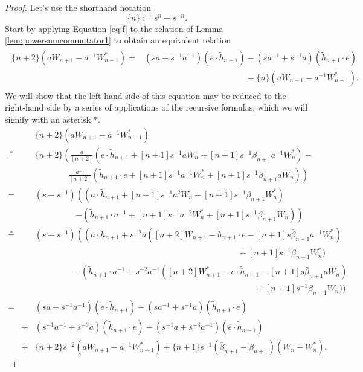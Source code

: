 \begin{proof}
Let's use the shorthand notation 
\[
\{n\} := s^n - s^{-n}.
\]
Start by applying Equation \eqref{eq:f} to the relation of Lemma \ref{lem:powersumcommutator1} to obtain an equivalent relation
\begin{align}\label{eq_perprel4}
\begin{split}
\{n+2\} \left( aW_{n+1} - a^{-1}W^*_{n+1} \right) =& \left( sa+s^{-1}a^{-1} \right) \left( e \cdot \tilde{h}_{n+1} \right) - \left( sa^{-1}+s^{-1}a \right) \left( \tilde{h}_{n+1} \cdot e \right) \\
 & \qquad\qquad\qquad\qquad\qquad\qquad - \{n\}\left( aW_{n-1}-a^{-1}W^*_{n-1} \right).
\end{split}
\end{align}
We will show that the left-hand side of this equation may be reduced to the right-hand side by a series of applications of the recursive formulas, which we will signify with an asterisk $\ast$. 
\begin{eqnarray*}
&& \{n+2\} \left( aW_{n+1} - a^{-1}W^*_{n+1} \right) \\
\overset{\ast}{=}&& \{n+2\} \left( \frac{a}{[n+2]} \left( e \cdot \tilde{h}_{n+1} + [n+1]s^{-1}aW_n + [n+1]s^{-1}\beta_{n+1}a^{-1}W^*_n \right) \right.- \\
&&\left.\qquad\qquad\frac{a^{-1}}{[n+2]} \left( \tilde{h}_{n+1} \cdot e + [n+1]s^{-1}a^{-1}W^*_n + [n+1]s^{-1}\beta_{n+1}aW_n \right) \right)  \\
=&& \left( s - s^{-1} \right) \left( \left( a \cdot \tilde{h}_{n+1} + [n+1]s^{-1}a^2W_n + [n+1]s^{-1}\beta_{n+1}W^*_n \right) \right. \\
&&\qquad\qquad\,\,\,\,\,\left.-\left( \tilde{h}_{n+1} \cdot a^{-1} + [n+1]s^{-1}a^{-2}W^*_n + [n+1]s^{-1}\beta_{n+1}W_n \right)\right) \\
\overset{\ast}{=}&&\left( s-s^{-1} \right) \left( \left( a \cdot \tilde{h}_{n+1} + s^{-2}a \left( [n+2]W_{n+1} - \tilde{h}_{n+1} \cdot e - [n+1]s\bar{\beta}_{n+1}a^{-1}W^*_n \right) \right. \right. \\
&&\qquad\qquad\qquad\qquad\qquad\qquad\qquad\qquad\qquad\qquad\qquad\qquad
+ [n+1]s^{-1}\beta_{n+1}W^*_n \Big)  \\
&&\qquad\qquad\,\,\,\, \left. - \left( \tilde{h}_{n+1} \cdot a^{-1} + s^{-2}a^{-1}\left( [n+2]W^*_{n+1} - e \cdot \tilde{h}_{n+1} - [n+1]s\bar{\beta}_{n+1}aW_n \right) \right. \right. \\
&&\qquad\qquad\qquad\qquad\qquad\qquad\qquad\qquad\qquad\qquad\qquad\qquad\quad\quad
+ [n+1]s^{-1}\beta_{n+1}W_n \Big) \Big) \\
=&&\left( sa + s^{-1}a^{-1} \right) \left( e \cdot \tilde{h}_{n+1} \right) - \left( sa^{-1} + s^{-1}a \right) \left( \tilde{h}_{n+1} \cdot e \right) \\
&+& \left( s^{-1}a^{-1} + s^{-3}a \right) \left( \tilde{h}_{n+1} \cdot e \right) - \left( s^{-1}a + s^{-3}a^{-1} \right) \left( e \cdot \tilde{h}_{n+1} \right) \\
&+& \{n+2\}s^{-2}\left( aW_{n+1} - a^{-1} W^*_{n+1} \right) + \{n+1\}s^{-1}\left( \bar{\beta}_{n+1} - \beta_{n+1} \right) \left( W_n - W^*_n \right).
\end{eqnarray*}


\end{proof}
